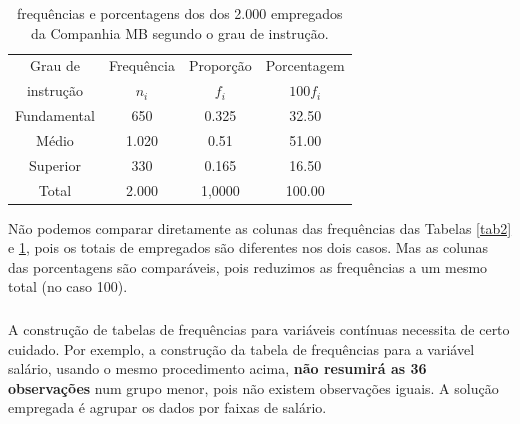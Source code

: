 \documentclass[12pt]{beamer}
\begin{document}
\begin{frame}{}
\frametitle{}
\begin{block}{}
\justifying
\begin{table}[H]
\caption{frequências e porcentagens dos dos 2.000 empregados da Companhia MB segundo o grau de instrução.}
\label{tab3}
\begin{tabular}{c|c|c|c}
\hline
Grau de   &Frequência&Proporção&Porcentagem\\
instrução &$n_{i}$   &$f_{i}$  &$100f_{i}$ \\
\hline
Fundamental&650      &0.325    &32.50      \\
Médio      &1.020    &0.51     &51.00      \\
Superior   & 330     &0.165    &16.50      \\
\hline
Total      &2.000    &1,0000   &100.00     \\
\hline
\end{tabular}
\end{table}
\end{block}
\begin{block}{}
Não podemos comparar diretamente as colunas das frequências das Tabelas \ref{tab2} e \ref{tab3}, pois os totais de empregados são diferentes nos dois casos. Mas 
as colunas das porcentagens são comparáveis, pois reduzimos as frequências a um mesmo total (no caso 100).
\end{block}
\end{frame}

\begin{frame}{}
\frametitle{}
\begin{block}{}
\justifying
A construção de tabelas de frequências para variáveis contínuas necessita de certo
cuidado. Por exemplo, a construção da tabela de frequências para a variável salário,
usando o mesmo procedimento acima, \textbf{não resumirá as 36 observações} num grupo
menor, pois não existem observações iguais. A solução empregada é agrupar os dados
por faixas de salário.
\end{block}
\end{frame}
\end{document}
